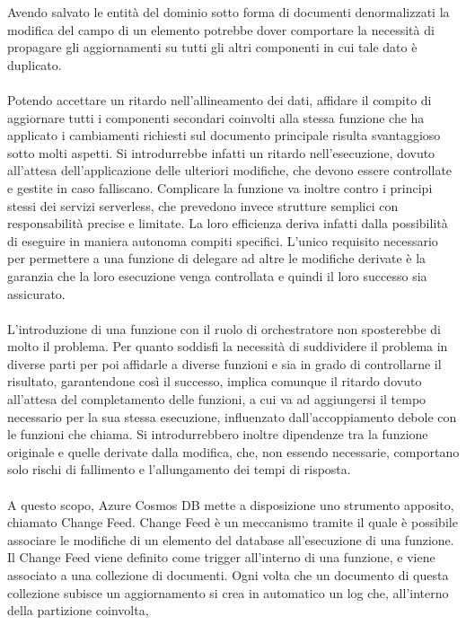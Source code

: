 Avendo salvato le entità del dominio sotto forma di documenti denormalizzati
la modifica del campo di un elemento potrebbe dover comportare la necessità
di propagare gli aggiornamenti su tutti gli altri componenti in cui tale dato è duplicato.\\
\\
Potendo accettare un ritardo nell'allineamento dei dati,
affidare il compito di aggiornare tutti i componenti secondari coinvolti
alla stessa funzione che ha applicato i cambiamenti richiesti sul documento principale
risulta svantaggioso sotto molti aspetti.
Si introdurrebbe infatti un ritardo nell'esecuzione, 
dovuto all'attesa dell'applicazione delle ulteriori modifiche, 
che devono essere controllate e gestite in caso falliscano.
Complicare la funzione va inoltre contro i principi stessi 
dei servizi serverless, 
che prevedono invece strutture semplici con responsabilità precise e limitate.
La loro efficienza deriva infatti dalla possibilità 
di eseguire in maniera autonoma compiti specifici.
L'unico requisito necessario per permettere a una funzione di delegare ad altre le modifiche derivate
è la garanzia che la loro esecuzione venga controllata e quindi il loro successo sia assicurato.\\
\\
L'introduzione di una funzione con il ruolo di orchestratore 
non sposterebbe di molto il problema.
Per quanto soddisfi la necessità di suddividere il problema in diverse parti
per poi affidarle a diverse funzioni e sia in grado di controllarne il risultato, 
garantendone così il successo,
implica comunque il ritardo dovuto all'attesa del completamento delle funzioni, 
a cui va ad aggiungersi il tempo necessario per la sua stessa esecuzione,
influenzato dall'accoppiamento debole con le funzioni che chiama.
Si introdurrebbero inoltre dipendenze tra la funzione originale e
quelle derivate dalla modifica, che, non essendo necessarie, 
comportano solo rischi di fallimento e l'allungamento dei tempi di risposta.\\
\\
A questo scopo, Azure Cosmos DB mette a disposizione uno strumento apposito, chiamato Change Feed.
Change Feed è un meccanismo tramite il quale è possibile 
associare le modifiche di un elemento del database 
all'esecuzione di una funzione.
Il Change Feed viene definito come trigger all'interno di una funzione, 
e viene associato a una collezione di documenti.
Ogni volta che un documento di questa collezione subisce un aggiornamento
si crea in automatico un log che,
all'interno della partizione coinvolta, 
